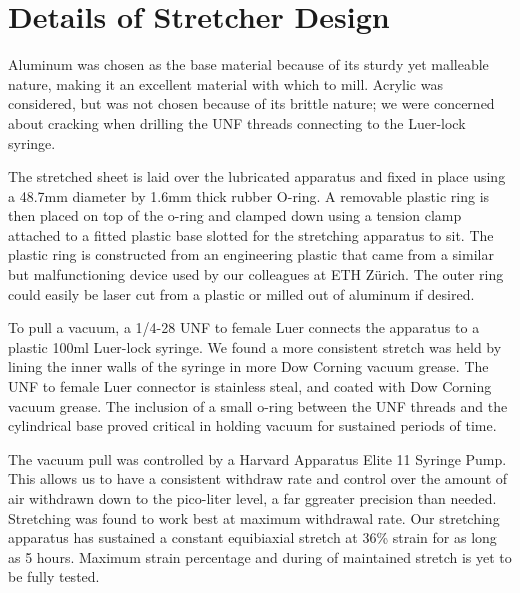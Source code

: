 \section{Details of Stretcher Design}

Aluminum was chosen as the base material because of its sturdy yet malleable nature, making it an excellent material with which to mill. Acrylic was considered, but was not chosen because of its brittle nature; we were concerned about cracking when drilling the UNF threads connecting to the Luer-lock syringe.

The stretched sheet is laid over the lubricated apparatus and fixed in place using a 48.7mm diameter by 1.6mm thick rubber O-ring. A removable plastic ring is then placed on top of the o-ring and clamped down using a tension clamp attached to a fitted plastic base slotted for the stretching apparatus to sit. The plastic ring is constructed from an engineering plastic that came from a similar but malfunctioning device used by our colleagues at ETH Zürich. The outer ring could easily be laser cut from a plastic or milled out of aluminum if desired. 

To pull a vacuum, a 1/4-28 UNF to female Luer connects the apparatus to a plastic 100ml Luer-lock syringe. We found a more consistent stretch was held by lining the inner walls of the syringe in more Dow Corning vacuum grease. The UNF to female Luer connector is stainless steal, and coated with Dow Corning vacuum grease. The inclusion of a small o-ring between the UNF threads and the cylindrical base proved critical in holding vacuum for sustained periods of time.

The vacuum pull was controlled by a Harvard Apparatus Elite 11 Syringe Pump. This allows us to have a consistent withdraw rate and control over the amount of air withdrawn down to the pico-liter level, a far ggreater precision than needed. Stretching was found to work best at maximum withdrawal rate. Our stretching apparatus has sustained a constant equibiaxial stretch at 36\% strain for as long as 5 hours. Maximum strain percentage and during of maintained stretch is yet to be fully tested.


